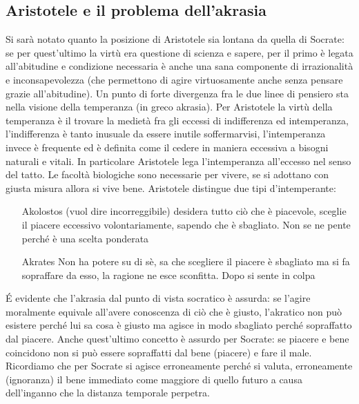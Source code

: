 \documentclass[10pt,a4paper]{article}
\begin{document}
\subsection{Aristotele e il problema dell'akrasia}
Si sarà notato quanto la posizione di Aristotele sia lontana da quella di Socrate: se per quest'ultimo la virtù era questione di scienza e sapere, per il primo è legata all'abitudine e condizione necessaria è anche una sana componente di irrazionalità e inconsapevolezza (che permettono di agire virtuosamente anche senza pensare grazie all'abitudine). Un punto di forte divergenza fra le due linee di pensiero sta nella visione della temperanza (in greco akrasia). Per Aristotele la virtù della temperanza è il trovare la medietà fra gli eccessi di indifferenza ed intemperanza, l'indifferenza è tanto inusuale da essere inutile soffermarvisi, l'intemperanza invece è frequente ed è definita come il cedere in maniera eccessiva a bisogni naturali e vitali. In particolare Aristotele lega l'intemperanza all'eccesso nel senso del tatto. Le facoltà biologiche sono necessarie per vivere, se si adottano con giusta misura allora si vive bene.  Aristotele distingue due tipi d'intemperante:
\begin{itemize}
	\item[Akolostos] (vuol dire incorreggibile) desidera tutto ciò che è piacevole, sceglie il piacere eccessivo volontariamente, sapendo che è sbagliato. Non se ne pente perché è una scelta ponderata  
	\item[Akrates] Non ha potere su di sè, sa che scegliere il piacere è sbagliato ma si fa sopraffare da esso, la ragione ne esce sconfitta. Dopo si sente in colpa
\end{itemize}
\'E evidente che l'akrasia dal punto di vista socratico è assurda: se l'agire moralmente equivale all'avere conoscenza di ciò che è giusto, l'akratico non può esistere perché lui sa cosa è giusto ma agisce in modo sbagliato perché sopraffatto dal piacere. Anche quest'ultimo concetto è assurdo per Socrate: se piacere e bene coincidono non si può essere sopraffatti dal bene (piacere) e fare il male. Ricordiamo che per Socrate si agisce erroneamente perché si valuta, erroneamente (ignoranza) il bene immediato come maggiore di quello futuro a causa dell'inganno che la distanza temporale perpetra. 
\end{document}
